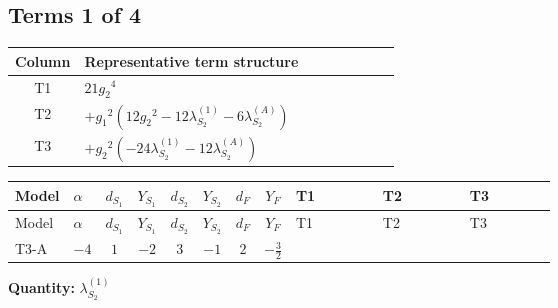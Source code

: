 \documentclass[8pt]{article}
\begin{document}
\begin{landscape}
\subsection*{Terms 1 of 4}
\begin{center}
\begin{tabular}{@{}c >{\raggedright\arraybackslash}p{0.82\linewidth}@{}}
\toprule
Column & Representative term structure \\
\midrule
T1 & \(\displaystyle 21 {g_2}^4\) \\
\midrule
T2 & \(\displaystyle +{g_1}^2 \left(12 {g_2}^2-12 {\lambda_{S_2}^{(1)}}-6 {\lambda_{S_2}^{(A)}}\right)\) \\
\midrule
T3 & \(\displaystyle +{g_2}^2 (-24 {\lambda_{S_2}^{(1)}}-12 {\lambda_{S_2}^{(A)}})\) \\
\midrule
\bottomrule
\end{tabular}
\end{center}
\smallskip
\tiny
\begin{longtable}{@{}llcccccc >{\raggedright\arraybackslash}p{0.21\linewidth} >{\raggedright\arraybackslash}p{0.21\linewidth} >{\raggedright\arraybackslash}p{0.21\linewidth}@{}}
\toprule
Model & $\alpha$ & $d_{S_1}$ & $Y_{S_1}$ & $d_{S_2}$ & $Y_{S_2}$ & $d_F$ & $Y_F$ & T1 & T2 & T3 \\
\midrule
\endfirsthead
\toprule
Model & $\alpha$ & $d_{S_1}$ & $Y_{S_1}$ & $d_{S_2}$ & $Y_{S_2}$ & $d_F$ & $Y_F$ & T1 & T2 & T3 \\
\midrule
\endhead
T3-A & $-4$ & $1$ & $-2$ & $3$ & $-1$ & $2$ & $-\frac{3}{2}$ & \scriptsize\adjustbox{max width=\linewidth}{$\begin{gathered} 21 {g_2}^4\end{gathered}$} & \scriptsize\adjustbox{max width=\linewidth}{$\begin{gathered} +{g_1}^2 \left(12 {g_2}^2-12 {\lambda_{S_2}^{(1)}}-6 {\lambda_{S_2}^{(A)}}\right)\end{gathered}$} & \scriptsize\adjustbox{max width=\linewidth}{$\begin{gathered} +{g_2}^2 (-24 {\lambda_{S_2}^{(1)}}-12 {\lambda_{S_2}^{(A)}})\end{gathered}$} \\
\midrule
\bottomrule
\end{longtable}
\clearpage
\noindent\textbf{Quantity: }$\lambda_{S_2}^{(1)}$\par\smallskip

\end{landscape}
\end{document}
